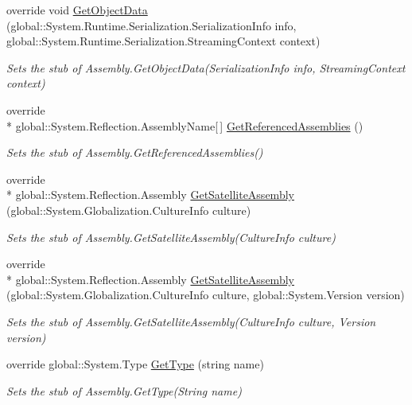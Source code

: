 \begin{DoxyCompactItemize}
override void \hyperlink{class_system_1_1_reflection_1_1_fakes_1_1_stub_assembly_ab8bfd90cb5f35c15399d659527a04428}{Get\-Object\-Data} (global\-::\-System.\-Runtime.\-Serialization.\-Serialization\-Info info, global\-::\-System.\-Runtime.\-Serialization.\-Streaming\-Context context)
\begin{DoxyCompactList}\small\item\em Sets the stub of Assembly.\-Get\-Object\-Data(\-Serialization\-Info info, Streaming\-Context context)\end{DoxyCompactList}\item 
override \\*
global\-::\-System.\-Reflection.\-Assembly\-Name\mbox{[}$\,$\mbox{]} \hyperlink{class_system_1_1_reflection_1_1_fakes_1_1_stub_assembly_aabd1090892e310be28ab986cfbc630b1}{Get\-Referenced\-Assemblies} ()
\begin{DoxyCompactList}\small\item\em Sets the stub of Assembly.\-Get\-Referenced\-Assemblies()\end{DoxyCompactList}\item 
override \\*
global\-::\-System.\-Reflection.\-Assembly \hyperlink{class_system_1_1_reflection_1_1_fakes_1_1_stub_assembly_ae4e9ba3e4adc81e33bc8c37090f14a50}{Get\-Satellite\-Assembly} (global\-::\-System.\-Globalization.\-Culture\-Info culture)
\begin{DoxyCompactList}\small\item\em Sets the stub of Assembly.\-Get\-Satellite\-Assembly(\-Culture\-Info culture)\end{DoxyCompactList}\item 
override \\*
global\-::\-System.\-Reflection.\-Assembly \hyperlink{class_system_1_1_reflection_1_1_fakes_1_1_stub_assembly_a23f441c86beba7229756376dd9cda54a}{Get\-Satellite\-Assembly} (global\-::\-System.\-Globalization.\-Culture\-Info culture, global\-::\-System.\-Version version)
\begin{DoxyCompactList}\small\item\em Sets the stub of Assembly.\-Get\-Satellite\-Assembly(\-Culture\-Info culture, Version version)\end{DoxyCompactList}\item 
override global\-::\-System.\-Type \hyperlink{class_system_1_1_reflection_1_1_fakes_1_1_stub_assembly_a018939667342d2966ce034a9b1db0479}{Get\-Type} (string name)
\begin{DoxyCompactList}\small\item\em Sets the stub of Assembly.\-Get\-Type(\-String name)\end{DoxyCompactList}\item 

\end{DoxyCompactItemize}
